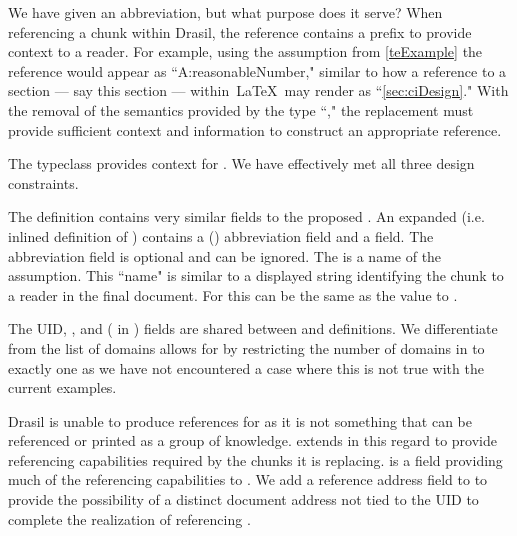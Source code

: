 We have given  an abbreviation, but what purpose does it serve? When referencing a chunk within Drasil, the reference contains a prefix to provide context to a reader. For example, using the assumption from \autoref{teExample} the reference would appear as ``A:reasonableNumber," similar to how a reference to a section --- say this section --- within\ \LaTeX\ may render as ``\autoref{sec:ciDesign}." With the removal of the semantics provided by the type ``," the replacement must provide sufficient context and information to construct an appropriate reference.

The  typeclass provides context for . We have effectively met all three design constraints. 

The  definition contains very similar fields to the proposed . An expanded (i.e. inlined definition of )  contains a () abbreviation field and a  field. The abbreviation field is optional and can be ignored. The  is a name of the assumption. This ``name" is similar to a displayed string identifying the chunk to a reader in the final document. For  this can be the same as the value to . 

The UID, , and  ( in ) fields are shared between  and  definitions. We differentiate from the list of domains  allows for  by restricting the number of domains in  to exactly one as we have not encountered a case where this is not true with the current examples. 

Drasil is unable to produce references for  as it is not something that can be referenced or printed as a group of knowledge.  extends  in this regard to provide referencing capabilities required by the chunks it is replacing.  is a field providing much of the referencing capabilities to . We add a reference address field to  to provide the possibility of a distinct document address not tied to the UID to complete the realization of referencing .

